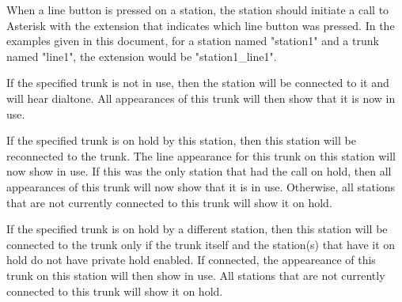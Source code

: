 When a line button is pressed on a station, the station should initiate a
call to Asterisk with the extension that indicates which line button was
pressed.  In the examples given in this document, for a station named
"station1" and a trunk named "line1", the extension would be "station1\_line1".

If the specified trunk is not in use, then the station will be connected to it and
will hear dialtone.  All appearances of this trunk will then show that it
is now in use.

If the specified trunk is on hold by this station, then this station will be
reconnected to the trunk.  The line appearance for this trunk on this station
will now show in use.  If this was the only station that had the call on hold,
then all appearances of this trunk will now show that it is in use.  Otherwise,
all stations that are not currently connected to this trunk will show it
on hold.

If the specified trunk is on hold by a different station, then this station
will be connected to the trunk only if the trunk itself and the station(s) that
have it on hold do not have private hold enabled.  If connected, the appeareance
of this trunk on this station will then show in use.  All stations that are not
currently connected to this trunk will show it on hold.

%
